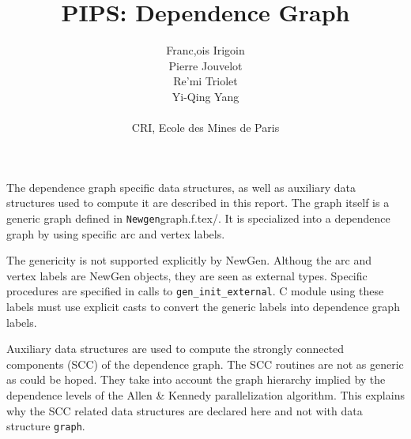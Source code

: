 

\title{PIPS: Dependence Graph}
\author{Franc,ois Irigoin \\
    Pierre Jouvelot \\
    Re'mi Triolet\\
    Yi-Qing Yang \\
\\
    CRI, Ecole des Mines de Paris}

\newcommand{\domain}[2]{\paragraph{{#1}}\paragraph{}{#2}}


\maketitle

\sloppy

The dependence graph specific data structures, as well as auxiliary data
structures used to compute it are described in this report. The graph
itself is a generic graph defined in \verb/Newgen/graph.f.tex/. It is
specialized into a dependence graph by using specific arc and vertex
labels. 

The genericity is not supported explicitly by NewGen. Althoug the arc
and vertex labels are NewGen objects, they are seen as external
types. Specific procedures are specified in calls to
\verb/gen_init_external/. C module using these labels must use explicit
casts to convert the generic labels into dependence graph labels.

Auxiliary data structures are used to compute the strongly connected
components (SCC) of the dependence graph. The SCC routines are not as
generic as could be hoped. They take into account the graph hierarchy
implied by the dependence levels of the Allen \& Kennedy parallelization
algorithm. This explains why the SCC related data structures are
declared here and not with data structure \verb/graph/.

\iffalse
Les structures de donne'es suivantes sont utilise'es par la phase de
construction du graphe des de'pendances. Elles sont construites en
utilisant les structures de donne'es \verb+statement+ et \verb+effect+
qui ont e'te' de'finies dans la repre'sentation interne, ainsi que la
structure de donne'es ge'ne'riques \verb+vertex+ qui fait partie du
package {\em graph}.
\fi

